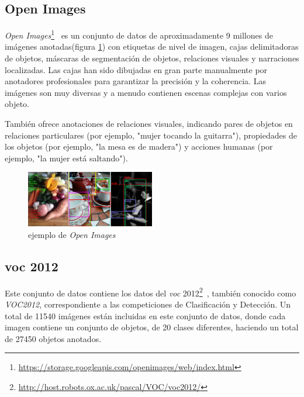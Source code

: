 \subsection{Open Images}
\textit{Open Images}\footnote{\url{https://storage.googleapis.com/openimages/web/index.html}}~\cite{OpenImages} es un conjunto de datos de aproximadamente 9 millones de imágenes anotadas(figura \ref{fig.oi}) con etiquetas de nivel de imagen, cajas delimitadoras de objetos, máscaras de segmentación de objetos, relaciones visuales y narraciones localizadas. Las cajas han sido dibujadas en gran parte manualmente por anotadores profesionales para garantizar la precisión y la coherencia. Las imágenes son muy diversas y a menudo contienen escenas complejas con varios objeto. 

También ofrece anotaciones de relaciones visuales, indicando pares de objetos en relaciones particulares (por ejemplo, "mujer tocando la guitarra"), propiedades de los objetos (por ejemplo, "la mesa es de madera") y acciones humanas (por ejemplo, "la mujer está saltando").

\begin{figure}[H]
  \begin{center}
    \includegraphics[width=0.5\textwidth]{figures/estado_arte/openImages.png}
		\caption{ejemplo de \textit{Open Images}}
		\label{fig.oi}
		\end{center}
\end{figure}

\subsection{\acrfull{voc} 2012}

Este conjunto de datos contiene los datos del \textit{\acrfull{voc}} 2012\footnote{\url{http://host.robots.ox.ac.uk/pascal/VOC/voc2012/}}~\cite{pascal-voc-2012}, también conocido como \textit{VOC2012}, correspondiente a las competiciones de Clasificación y Detección. Un total de 11540 imágenes están incluidas en este conjunto de datos, donde cada imagen contiene un conjunto de objetos, de 20 clases diferentes, haciendo un total de 27450 objetos anotados.